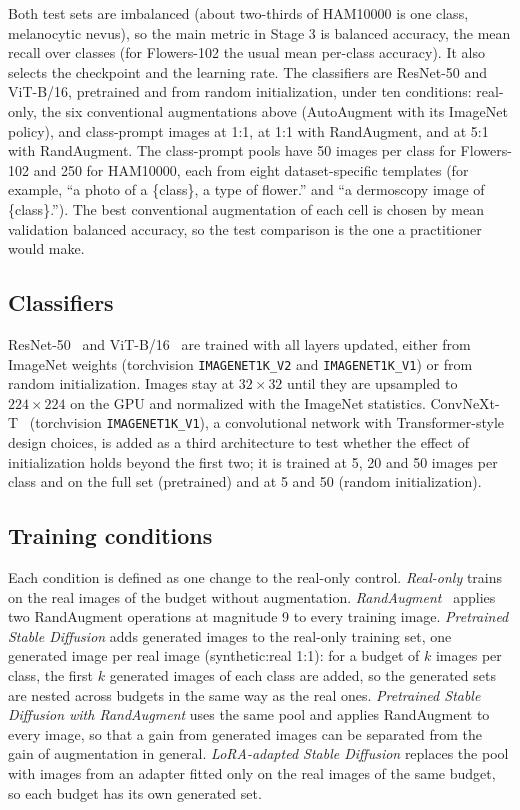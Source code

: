 Both test sets are imbalanced (about two-thirds of HAM10000 is one class, melanocytic nevus), so the main metric
in Stage 3 is balanced accuracy, the mean recall over classes (for Flowers-102 the usual mean per-class accuracy).
It also selects the checkpoint and the learning rate. The classifiers are ResNet-50 and ViT-B/16, pretrained and
from random initialization, under ten conditions: real-only, the six conventional augmentations above
(AutoAugment with its ImageNet policy), and class-prompt images at 1:1, at 1:1 with RandAugment, and at 5:1 with
RandAugment. The class-prompt pools have 50 images per class for Flowers-102 and 250 for HAM10000, each from eight
dataset-specific templates (for example, ``a photo of a \{class\}, a type of flower.'' and ``a dermoscopy image of
\{class\}.''). The best conventional augmentation of each cell is chosen by mean validation balanced accuracy, so
the test comparison is the one a practitioner would make.

\subsection{Classifiers}
ResNet-50~\cite{he2016deep} and ViT-B/16~\cite{dosovitskiy2021image} are trained with all layers updated, either from ImageNet weights (torchvision \texttt{IMAGENET1K\_V2} and \texttt{IMAGENET1K\_V1}) or from random initialization. Images stay at $32\times32$ until they are upsampled to $224\times224$ on the GPU and normalized with the ImageNet statistics.
ConvNeXt-T~\cite{liu2022convnet} (torchvision \texttt{IMAGENET1K\_V1}), a convolutional network with
Transformer-style design choices, is added as a third architecture to test whether the effect of initialization
holds beyond the first two; it is trained at 5, 20 and 50 images per class and on the full set (pretrained) and
at 5 and 50 (random initialization).

\subsection{Training conditions}
Each condition is defined as one change to the real-only control. \textit{Real-only} trains on the real images of the budget without augmentation. \textit{RandAugment}~\cite{cubuk2020randaugment} applies two RandAugment operations at magnitude 9 to every training image. \textit{Pretrained Stable Diffusion} adds generated images to the real-only training set, one generated image per real image (synthetic:real 1:1): for a budget of $k$ images per class, the first $k$ generated images of each class are added, so the generated sets are nested across budgets in the same way as the real ones. \textit{Pretrained Stable Diffusion with RandAugment} uses the same pool and applies RandAugment to every image, so that a gain from generated images can be separated from the gain of augmentation in general. \textit{LoRA-adapted Stable Diffusion} replaces the pool with images from an adapter fitted only on the real images of the same budget, so each budget has its own generated set.

